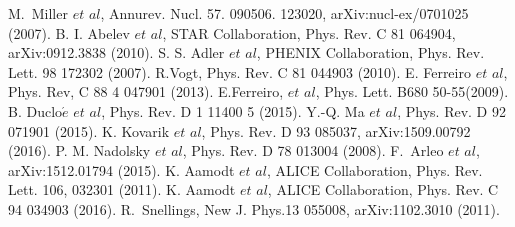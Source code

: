 \begin{thebibliography}{4}
 M.~Miller $et$ $al$, Annurev. Nucl. 57. 090506. 123020, arXiv:nucl-ex/0701025 (2007). 
B. I. Abelev $et$ $al$, STAR Collaboration, Phys. Rev. C 81 064904,  arXiv:0912.3838 (2010).
 S. S. Adler $et$ $al$, PHENIX Collaboration, Phys. Rev. Lett. 98 172302 (2007).
 R.Vogt, Phys. Rev. C 81 044903 (2010).
 E. Ferreiro $et$ $al$, Phys. Rev, C 88 4 047901 (2013).
 E.Ferreiro, $et$ $al$, Phys. Lett. B680 50-55(2009).
 B. Duclo$\acute{e}$ $et$ $al$, Phys. Rev. D 1 11400 5 (2015).
 Y.-Q. Ma $et$ $al$, Phys. Rev. D 92 071901 (2015).
 K. Kovarik $et$ $al$, Phys. Rev. D 93 085037, arXiv:1509.00792 (2016). 
 P. M. Nadolsky $et$ $al$, Phys. Rev. D 78 013004 (2008). 
 F.~Arleo $et$ $al$, arXiv:1512.01794 (2015). 
 K. Aamodt $et$ $al$, ALICE Collaboration, Phys. Rev. Lett. 106, 032301 (2011).
 K. Aamodt $et$ $al$, ALICE Collaboration, Phys. Rev. C 94 034903 (2016).
 R.~Snellings, New J. Phys.13 055008,  arXiv:1102.3010 (2011).
\end{thebibliography}
